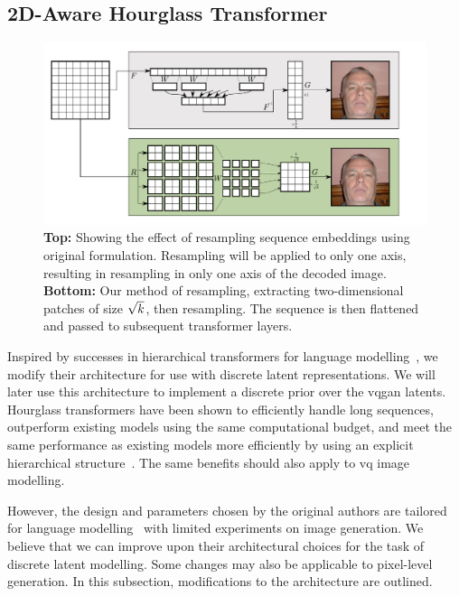 \subsection{2D-Aware Hourglass Transformer}
\label{subsec:improvedHourglass}

\begin{figure}[htp]
    \centering
    \includegraphics[width=\textwidth]{figures/resample.pdf}
    \caption{
        \textbf{Top:} Showing the effect of resampling sequence embeddings using
        original formulation. Resampling will be applied to only one axis,
        resulting in resampling in only one axis of the decoded image.
        \textbf{Bottom:} Our method of resampling, extracting 
        two-dimensional patches of size $\sqrt{k}$, then 
        resampling. The sequence is then flattened and passed to
        subsequent transformer layers.
    }
    \label{fig:resample}
\end{figure}

Inspired by successes in hierarchical transformers for language
modelling~\cite{nawrot2021hierarchical}, we modify their architecture for use
with discrete latent representations. We will later use this architecture to
implement a discrete prior over the \gls{vqgan} latents. Hourglass transformers
have been shown to efficiently handle long sequences, outperform existing models
using the same computational budget, and meet the same performance as existing
models more efficiently by using an explicit hierarchical
structure~\cite{nawrot2021hierarchical}. The same benefits should also apply to
\gls{vq} image modelling. 

However, the design and parameters chosen by the original authors are tailored
for language modelling~\cite{nawrot2021hierarchical} with limited experiments on
image generation. We believe that we can improve upon their architectural
choices for the task of discrete latent modelling. Some changes may also be
applicable to pixel-level generation. In this subsection, modifications to the
architecture are outlined.

